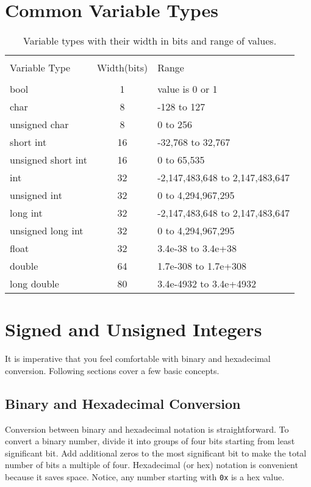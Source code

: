 \documentclass[12pt,a4paper]{article}
\begin{document}
\section{Common Variable Types}
\begin{table}[htb]
\centering
	\begin{tabular}{l c l}
	\hline \hline \\ [-2ex]
	Variable Type & Width(bits) & Range\\
	\hline \\ [-2ex]
	bool\footnotemark[1]~ & 1  & value is 0 or 1\\
	char               & 8  & -128 to 127\\
	unsigned char      & 8  & 0 to 256\\
	short int          & 16 & -32,768 to 32,767\\
	unsigned short int & 16 & 0 to 65,535\\
	int                & 32 & -2,147,483,648 to 2,147,483,647\\
	unsigned int       & 32 & 0 to 4,294,967,295\\
	long int           & 32 & -2,147,483,648 to 2,147,483,647\\
	unsigned long int  & 32 & 0 to 4,294,967,295\\
	float              & 32 & 3.4e-38 to 3.4e+38\\
	double             & 64 & 1.7e-308 to 1.7e+308\\
	long double        & 80 & 3.4e-4932 to 3.4e+4932\\
	\hline \hline
	\end{tabular}
\caption{Variable types with their width in bits and range of values.}
\label{Datatypes and Ranges}
\end{table}
\section{Signed and Unsigned Integers}
It is imperative that you feel comfortable with binary and hexadecimal conversion. Following sections cover a few basic concepts.

\subsection{Binary and Hexadecimal Conversion}
Conversion between binary and hexadecimal notation is straightforward. To convert a binary number, divide it into groups of four bits starting from least significant bit. Add additional zeros to the most significant bit to make the total number of bits a multiple of four. Hexadecimal (or hex) notation is convenient because it saves space. Notice, any number starting with \verb|0x| is a hex value.
\end{document}
